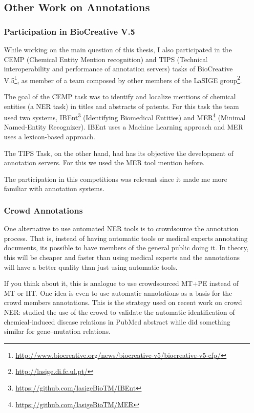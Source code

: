 \subsection{Other Work on Annotations}

\subsubsection{Participation in BioCreative V.5}
\label{biocreative}

While working on the main question of this thesis, I also participated in the CEMP (Chemical Entity Mention recognition) and TIPS (Technical interoperability and performance of annotation servers) tasks of BioCreative V.5\footnote{\url{http://www.biocreative.org/news/biocreative-v5/biocreative-v5-cfp/}}, as member of a team composed by other members of the LaSIGE group\footnote{\url{http://lasige.di.fc.ul.pt/}}.

The goal of the CEMP task was to identify and localize mentions of chemical entities (a NER task) in titles and abstracts of patents. For this task the team used two systems, IBEnt\footnote{\url{https://github.com/lasigeBioTM/IBEnt}} (Identifying Biomedical Entities) and MER\footnote{\url{https://github.com/lasigeBioTM/MER}} (Minimal Named-Entity Recognizer). IBEnt uses a Machine Learning approach and MER uses a lexicon-based approach. 

The TIPS Task, on the other hand, had has its objective the development of annotation servers. For this we used the MER tool mention before. 


The participation in this competitions was relevant since it made me more familiar with annotation systems.

\subsubsection{Crowd Annotations}

One alternative to use automated NER tools is to crowdsource the annotation process. That is, instead of having automatic tools or medical experts annotating documents, its possible to have members of the general public doing it. In theory, this will be cheaper and faster than using medical experts and the annotations will have a better quality than just using automatic tools.

If you think about it, this is analogue to use crowdsourced MT+PE instead of MT or HT. One idea is even to use automatic annotations as a basis for the crowd members annotations. This is the strategy used on recent work on crowd NER: \citep{Li2016} studied the use of the crowd to validate the automatic identification of chemical-induced disease relations in PubMed abstract while \citep{Burger2014} did something similar for gene–mutation relations.

